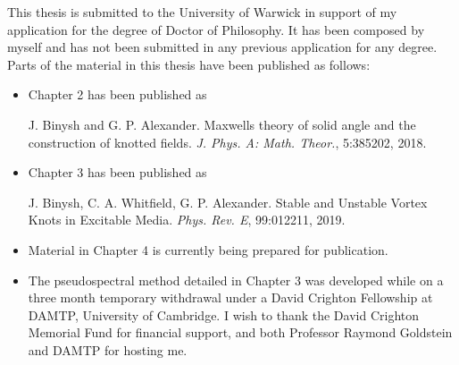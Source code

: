 This thesis is submitted to the University of Warwick in support of my application for the degree of Doctor of Philosophy. It has been composed by myself and has not been submitted in any previous application for any degree. Parts of the material in this thesis have been published as follows:
\begin{itemize}
\item Chapter 2 has been published as
    
    J. Binysh and G. P. Alexander. Maxwell\textsc{}s theory of solid angle and the construction of knotted fields. \emph{J. Phys. A: Math. Theor.}, 5:385202, 2018.

\item Chapter 3 has been published as
    
    J. Binysh, C. A. Whitfield, G. P. Alexander. Stable and Unstable Vortex Knots in Excitable Media.\emph{ Phys. Rev. E}, 99:012211, 2019. 

\item Material in Chapter 4 is currently being prepared for publication. 

\item The pseudospectral method detailed in Chapter 3 was developed while on a three month temporary withdrawal under a David Crighton Fellowship at DAMTP, University of Cambridge. I wish to thank the David Crighton Memorial Fund for financial support, and both Professor Raymond Goldstein and DAMTP for hosting me.
\end{itemize}
 

